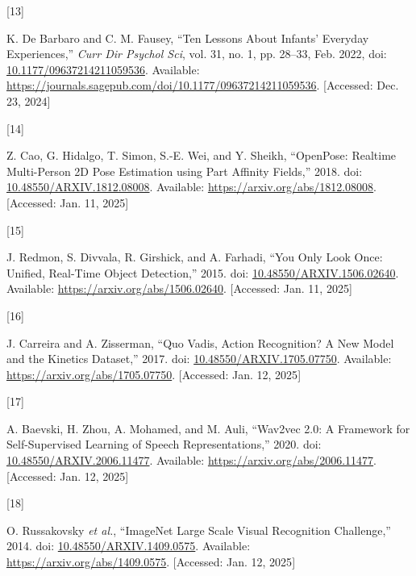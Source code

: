 \documentclass[
  man,floatsintext]{apa6}
\newlength{\cslhangindent}
\newlength{\csllabelwidth}
\newenvironment{CSLReferences}[2] %
 {\begin{list}{}{%
  \setlength{\itemindent}{0pt}
  \setlength{\leftmargin}{0pt}
  \setlength{\parsep}{0pt}
  \ifodd #1
   \setlength{\leftmargin}{\cslhangindent}
   \setlength{\itemindent}{-1\cslhangindent}
  \fi
  \setlength{\itemsep}{#2\baselineskip}}}
 {\end{list}}
\newcommand{\CSLLeftMargin}[1]{\parbox[t]{\csllabelwidth}{\strut#1\strut}}
\newcommand{\CSLRightInline}[1]{\parbox[t]{\linewidth - \csllabelwidth}{\strut#1\strut}}
\begin{document}
\begin{CSLReferences}{0}{0}
\CSLLeftMargin{{[}13{]} }%
\CSLRightInline{K. De Barbaro and C. M. Fausey, {``Ten {Lessons About Infants}' {Everyday Experiences},''} \emph{Curr Dir Psychol Sci}, vol. 31, no. 1, pp. 28--33, Feb. 2022, doi: \href{https://doi.org/10.1177/09637214211059536}{10.1177/09637214211059536}. Available: \url{https://journals.sagepub.com/doi/10.1177/09637214211059536}. {[}Accessed: Dec. 23, 2024{]}}

\CSLLeftMargin{{[}14{]} }%
\CSLRightInline{Z. Cao, G. Hidalgo, T. Simon, S.-E. Wei, and Y. Sheikh, {``{OpenPose}: {Realtime Multi-Person 2D Pose Estimation} using {Part Affinity Fields},''} 2018. doi: \href{https://doi.org/10.48550/ARXIV.1812.08008}{10.48550/ARXIV.1812.08008}. Available: \url{https://arxiv.org/abs/1812.08008}. {[}Accessed: Jan. 11, 2025{]}}

\CSLLeftMargin{{[}15{]} }%
\CSLRightInline{J. Redmon, S. Divvala, R. Girshick, and A. Farhadi, {``You {Only Look Once}: {Unified}, {Real-Time Object Detection},''} 2015. doi: \href{https://doi.org/10.48550/ARXIV.1506.02640}{10.48550/ARXIV.1506.02640}. Available: \url{https://arxiv.org/abs/1506.02640}. {[}Accessed: Jan. 11, 2025{]}}

\CSLLeftMargin{{[}16{]} }%
\CSLRightInline{J. Carreira and A. Zisserman, {``Quo {Vadis}, {Action Recognition}? {A New Model} and the {Kinetics Dataset},''} 2017. doi: \href{https://doi.org/10.48550/ARXIV.1705.07750}{10.48550/ARXIV.1705.07750}. Available: \url{https://arxiv.org/abs/1705.07750}. {[}Accessed: Jan. 12, 2025{]}}

\CSLLeftMargin{{[}17{]} }%
\CSLRightInline{A. Baevski, H. Zhou, A. Mohamed, and M. Auli, {``Wav2vec 2.0: {A Framework} for {Self-Supervised Learning} of {Speech Representations},''} 2020. doi: \href{https://doi.org/10.48550/ARXIV.2006.11477}{10.48550/ARXIV.2006.11477}. Available: \url{https://arxiv.org/abs/2006.11477}. {[}Accessed: Jan. 12, 2025{]}}

\CSLLeftMargin{{[}18{]} }%
\CSLRightInline{O. Russakovsky \emph{et al.}, {``{ImageNet Large Scale Visual Recognition Challenge},''} 2014. doi: \href{https://doi.org/10.48550/ARXIV.1409.0575}{10.48550/ARXIV.1409.0575}. Available: \url{https://arxiv.org/abs/1409.0575}. {[}Accessed: Jan. 12, 2025{]}}


\end{CSLReferences}
\end{document}
